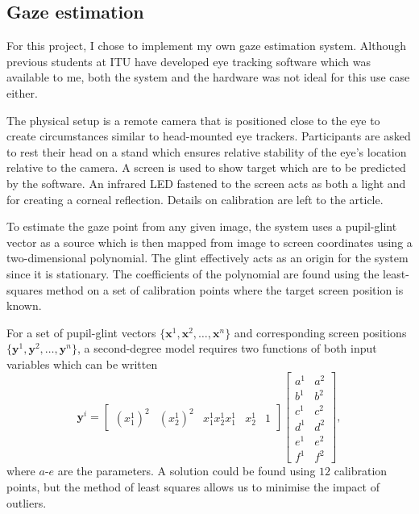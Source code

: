 \subsection{Gaze estimation}
For this project, I chose to implement my own gaze estimation system. Although previous students at ITU have developed eye tracking software which was available to me, both the system and the hardware was not ideal for this use case either. 

The physical setup is a remote camera that is positioned close to the eye to create circumstances similar to head-mounted eye trackers. Participants are asked to rest their head on a stand which ensures relative stability of the eye's location relative to the camera. A screen is used to show target which are to be predicted by the software. An infrared LED fastened to the screen acts as both a light and for creating a corneal reflection. Details on calibration are left to the article.

To estimate the gaze point from any given image, the system uses a pupil-glint vector as a source which is then mapped from image to screen coordinates using a two-dimensional polynomial. The glint effectively acts as an origin for the system since it is stationary. The coefficients of the polynomial are found using the least-squares method on a set of calibration points where the target screen position is known.

For a set of pupil-glint vectors $\{\mathbf{x}^1, \mathbf{x}^2, \dots, \mathbf{x}^n\}$ and corresponding screen positions $\{\mathbf{y}^1, \mathbf{y}^2, \dots, \mathbf{y}^n\}$, a second-degree model requires two functions of both input variables which can be written
\begin{equation}
    \mathbf{y}^i =  \begin{bmatrix}
        \left(x_1^{1}\right)^2 & \left(x_2^{1}\right)^2 & x_1^1x_2^1 x_1^1 & x_2^1 & 1\end{bmatrix} \begin{bmatrix}a^1&a^2\\ b^1&b^2\\ c^1&c^2\\ d^1&d^2\\ e^1&e^2\\ f^1&f^2\end{bmatrix},
\end{equation}
where $a$-$e$ are the parameters. A solution could be found using $12$ calibration points, but the method of least squares allows us to minimise the impact of outliers.

